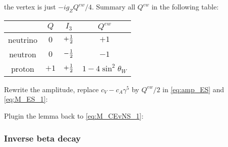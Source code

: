 
the vertex is just $-ig_Z Q^{ew}/4$. Summary all $Q^{ew}$ in the following table:

\begin{table}[htbp]
    \centering
    \begin{tabular}{|c c c c|}
        \hline
         & $Q$ & $I_3$ & $Q^{ew}$ \\
        \hline
        neutrino & $0$ & $+\frac{1}{2}$ & $+1$ \\
        \hline
        neutron & $0$ & $-\frac{1}{2}$ & $-1$ \\
        \hline
        proton & $+1$ & $+\frac{1}{2}$ & $1-4\sin^2{\theta_W}$ \\
        \hline
    \end{tabular}
\end{table}

Rewrite the amplitude, replace $c_V-c_A\gamma^5$ by $Q^{ew}/2$ in \eqref{eq:amp_ES} and \eqref{eq:M_ES_1}:



Plugin the lemma back to \eqref{eq:M_CEvNS_1}:


\subsubsection{Inverse beta decay}

\clearpage

